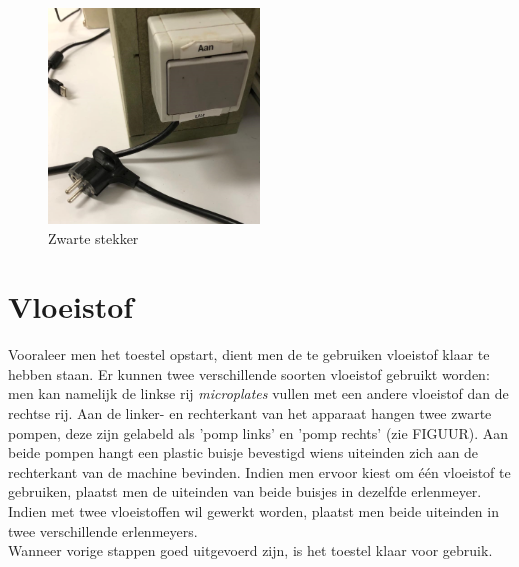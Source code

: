 \documentclass[A4]{kulakreport}
\begin{document}
\begin{figure}[h]
	\centering
	\includegraphics[width=0.5\textwidth]{stekker.png}
	\caption{Zwarte stekker}
	\label{fig:stekker}
	
\end{figure} 





\section{Vloeistof}

Vooraleer men het toestel opstart, dient men de te gebruiken vloeistof klaar te hebben staan. Er kunnen twee verschillende soorten vloeistof gebruikt worden: men kan namelijk de linkse rij \textit{microplates} vullen met een andere vloeistof dan de rechtse rij. Aan de linker- en rechterkant van het apparaat hangen twee zwarte pompen, deze zijn gelabeld als 'pomp links' en 'pomp rechts' (zie FIGUUR). Aan beide pompen hangt een plastic buisje bevestigd wiens uiteinden zich aan de rechterkant van de machine bevinden. Indien men ervoor kiest om één vloeistof te gebruiken, plaatst men de uiteinden van beide buisjes in dezelfde erlenmeyer. Indien met twee vloeistoffen wil gewerkt worden, plaatst men beide uiteinden in twee verschillende erlenmeyers. \\ Wanneer vorige stappen goed uitgevoerd zijn, is het toestel klaar voor gebruik.
\end{document}
